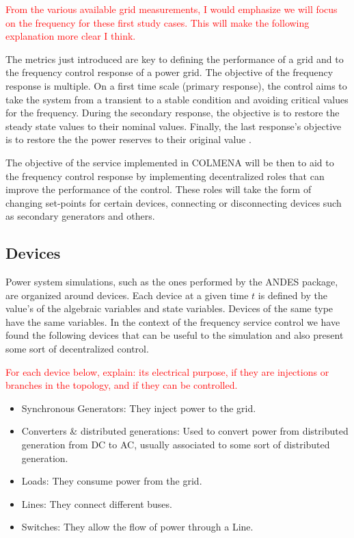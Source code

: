 \documentclass{article}
\begin{document}
\textcolor{red}{From the various available grid measurements, I would emphasize we will focus on the frequency for these first study cases. This will make the following explanation more clear I think.}

The metrics just introduced are key to defining the performance of a grid and to the frequency control response of a power grid. The objective of the frequency response is multiple. On a first time scale (primary response)\cite{source:NRELfrequency}, the control aims to take the system from a transient to a stable condition and avoiding critical values for the frequency. During the secondary response, the objective is to restore the steady state values to their nominal values. Finally, the last response's objective is to restore the the power reserves to their original value \cite{source:bookelectron}.

The objective of the service implemented in COLMENA will be then to aid to the frequency control response by implementing decentralized roles that can improve the performance of the control. These roles will take the form of changing set-points for certain devices, connecting or disconnecting devices such as secondary generators and others. 

\subsection{Devices}

Power system simulations, such as the ones performed by the ANDES package, are organized around devices. Each device at a given time $t$ is defined by the value's of the algebraic variables and state variables. Devices of the same type have the same variables. In the context of the frequency service control we have found the following devices that can be useful to the simulation and also present some sort of decentralized control.

\textcolor{red}{For each device below, explain: its electrical purpose, if they are injections or branches in the topology, and if they can be controlled.}
\begin{itemize}
    \item Synchronous Generators: They inject power to the grid.
    \item Converters \& distributed generations: Used to convert power from distributed generation from DC to AC, usually associated to some sort of distributed generation.
    \item Loads: They consume power from the grid.
    \item Lines: They connect different buses.
    \item Switches: They allow the flow of power through a Line.
\end{itemize}
\end{document}
